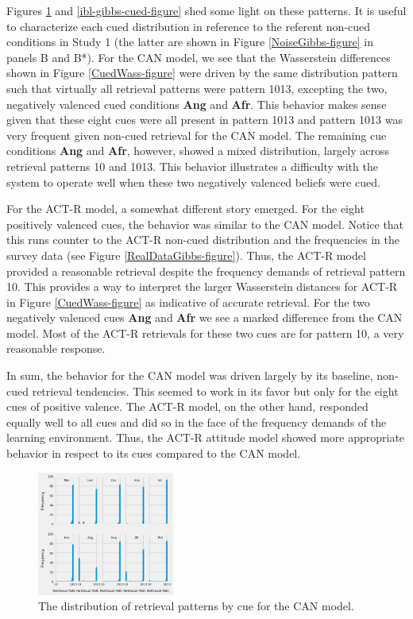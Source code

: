 \documentclass[10pt,letterpaper]{article}
\begin{document}
Figures \ref{can-gibbs-cued-figure} and \ref{ibl-gibbs-cued-figure} shed some light on these patterns.  It is useful to characterize each  cued distribution in reference to the referent non-cued conditions in Study 1 (the latter are shown in Figure \ref{NoiseGibbs-figure} in panels B and B*).  For the CAN model, we see that the Wasserstein differences shown in Figure \ref{CuedWass-figure} were driven by the same distribution pattern such that virtually all retrieval patterns were pattern 1013, excepting the two, negatively valenced cued conditions \textbf{Ang} and \textbf{Afr}. This behavior makes sense given that these eight cues were all present in pattern 1013 and pattern 1013 was very frequent given non-cued retrieval for the CAN model. The remaining cue conditions \textbf{Ang} and \textbf{Afr}, however, showed a mixed distribution, largely across retrieval patterns 10 and 1013.  This behavior illustrates a difficulty with the system to operate well when these two negatively valenced beliefs were cued.  

For the ACT-R model, a somewhat different story emerged.  For the eight positively valenced cues, the behavior was similar to the CAN model.  Notice that this runs counter to the ACT-R non-cued distribution and the frequencies in the survey data (see Figure \ref{RealDataGibbs-figure}).  Thus, the ACT-R model provided a reasonable retrieval despite the frequency demands of retrieval pattern 10.  This provides a way to interpret the larger Wasserstein distances for ACT-R in Figure \ref{CuedWass-figure} as indicative of accurate retrieval.  For the two negatively valenced cues \textbf{Ang} and \textbf{Afr} we see a marked difference from the CAN model.  Most of the ACT-R retrievals for these two cues are for pattern 10, a very reasonable response.  

In sum, the behavior for the CAN model was driven largely by its baseline, non-cued retrieval tendencies.  This seemed to work in its favor but only for the eight cues of positive valence.  The ACT-R model, on the other hand, responded equally well to all cues and did so in the face of the frequency demands of the learning environment.  Thus, the ACT-R attitude model showed more appropriate behavior in respect to its cues compared to the CAN model. 
\begin{figure}[H]
\begin{center}
\includegraphics[width=0.4\textwidth,height=0.3\textwidth]{CAN_Gibbs_Cued_2X5.png}
\end{center}
\caption{The distribution of retrieval patterns by cue for the CAN model.} 
\label{can-gibbs-cued-figure}
\end{figure}
\end{document}
